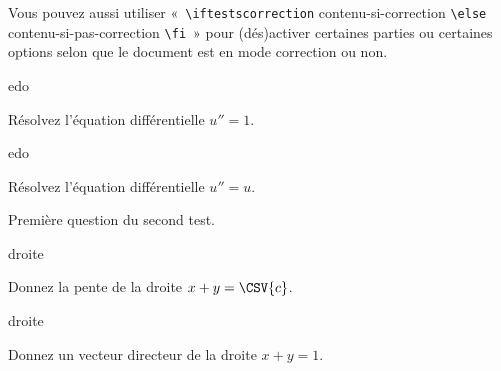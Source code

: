 \documentclass[12pt,a4paper, rulers]{tests}
\begin{document}
Vous pouvez aussi utiliser «~\verb+\iftestscorrection+
contenu-si-correction \verb+\else+ contenu-si-pas-correction
\verb+\fi+~» pour (dés)activer certaines parties ou certaines options
selon que le document est en mode correction ou non.

\vspace{3ex}

\begin{namequestion}{edo}%
  \begin{question}
    Résolvez l'équation différentielle $u'' = 1$.
  \end{question}
\end{namequestion}
\begin{namequestion}{edo}%
  \begin{question}
    Résolvez l'équation différentielle $u'' = u$.
  \end{question}
\end{namequestion}


\exam
{}%
\maketitle %

\begin{question}
  Première question du second test.
\end{question}


\begin{namequestion}{droite}
  \begin{question}
    Donnez la pente de la droite $x + y = \CSV{c}$.
  \end{question}
\end{namequestion}
\begin{namequestion}{droite}
  \begin{question}
    Donnez un vecteur directeur de la droite $x + y = 1$.    
  \end{question}
\end{namequestion}
\end{document}

